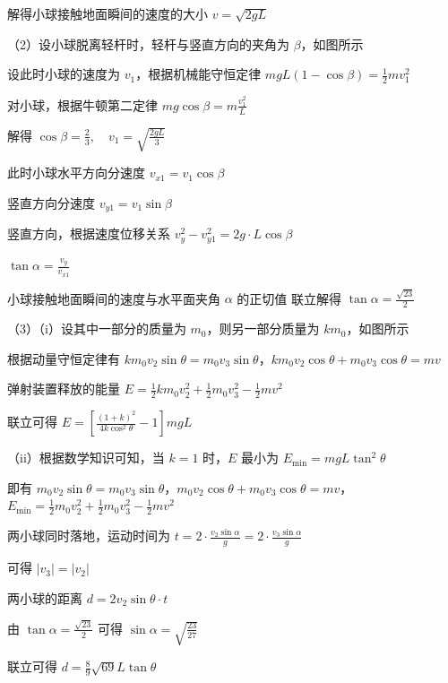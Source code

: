 \documentclass[\gkver]{gaokaozhenti}
\begin{document}
\begin{enumerate}
{解得小球接触地面瞬间的速度的大小 $v = \sqrt{2gL}$

（2）设小球脱离轻杆时，轻杆与竖直方向的夹角为 $\beta$，如图所示


设此时小球的速度为 $v_{1}$，根据机械能守恒定律
$mgL(1-\cos\beta)=\frac{1}{2}mv_{1}^{2}$

对小球，根据牛顿第二定律
$mg\cos\beta=m\frac{v_{1}^{2}}{L}$

解得 $\cos\beta=\frac{2}{3},\quad v_{1}=\sqrt{\frac{2gL}{3}}$

此时小球水平方向分速度 $v_{x1}=v_{1}\cos\beta$

竖直方向分速度 $v_{y1}=v_{1}\sin\beta$

竖直方向，根据速度位移关系 $v_{y}^{2}-v_{y1}^{2}=2g \cdot L\cos\beta$

$\tan\alpha=\frac{v_{y}}{v_{x1}}$

小球接触地面瞬间的速度与水平面夹角 $\alpha$ 的正切值
联立解得 $\tan\alpha=\frac{\sqrt{23}}{2}$

（3）（i）设其中一部分的质量为 $m_{0}$，则另一部分质量为 $km_{0}$，如图所示


根据动量守恒定律有 $km_{0}v_{2}\sin\theta=m_{0}v_{3}\sin\theta$，$km_{0}v_{2}\cos\theta+m_{0}v_{3}\cos\theta=mv$

弹射装置释放的能量
$E=\frac{1}{2}km_{0}v_{2}^{2}+\frac{1}{2}m_{0}v_{3}^{2}-\frac{1}{2}mv^{2}$

联立可得 $E = \left[\frac{(1 + k)^{2}}{4k\cos^{2}\theta} - 1\right]mgL$

（ii）根据数学知识可知，当 $k=1$ 时，$E$ 最小为 $E_{\min}=mgL\tan^{2}\theta$

即有 $m_0v_2\sin\theta=m_0v_3\sin\theta$，$m_0v_2\cos\theta+m_0v_3\cos\theta=mv$，
$E_{\min}=\frac{1}{2}m_0v_2^2+\frac{1}{2}m_0v_3^2-\frac{1}{2}mv^2$

两小球同时落地，运动时间为
$t=2 \cdot \frac{v_{2}\sin\alpha}{g}=2 \cdot \frac{v_{3}\sin\alpha}{g}$

可得 $\left|v_{3}\right|=\left|v_{2}\right|$

两小球的距离 $d = 2v_{2} \sin \theta \cdot t$

由 $\tan\alpha=\frac{\sqrt{23}}{2}$ 可得 $\sin\alpha=\sqrt{\frac{23}{27}}$

联立可得 $d=\frac{8}{9}\sqrt{69}L\tan\theta$
}
\end{enumerate}
\end{document}
